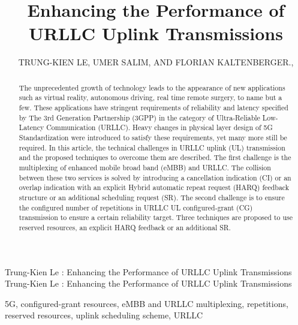 \documentclass{ieeeaccess}
\begin{document}

\title{Enhancing the Performance of URLLC Uplink Transmissions}
\author{\uppercase{Trung-Kien Le},
\uppercase{Umer Salim, and Florian Kaltenberger}.,
}
\address[1]{EURECOM, Sophia Anitpolis, France (e-mail: author@eurecom.fr)}
\address[2]{TCL Mobile, Sophia Antipolis, France (e-mail: author@tcl.com)}


\markboth
{Trung-Kien Le \headeretal: Enhancing the Performance of URLLC Uplink Transmissions}
{Trung-Kien Le \headeretal: Enhancing the Performance of URLLC Uplink Transmissions}


\begin{abstract}
The unprecedented growth of technology leads to the appearance of new applications such as virtual reality, autonomous driving, real time remote surgery, to name but a few. These applications have stringent requirements of reliability and latency specified by The 3rd Generation Partnership (3GPP) in the category of Ultra-Reliable Low-Latency Communication (URLLC). Heavy changes in physical layer design of 5G Standardization were introduced to satisfy these requirements, yet many more still be required. In this article, the technical challenges in URLLC uplink (UL) transmission and the proposed techniques to overcome them are described. The first challenge is the multiplexing of enhanced mobile broad band (eMBB) and URLLC. The collision between these two services is solved by introducing a cancellation indication (CI) or an overlap indication with an explicit Hybrid automatic repeat request (HARQ) feedback structure or an additional scheduling request (SR). The second challenge is to ensure the configured number of repetitions in URLLC UL configured-grant (CG) transmission to ensure a certain reliability target. Three techniques are proposed to use reserved resources, an explicit HARQ feedback or an additional SR.
\end{abstract}

\begin{keywords}
5G, configured-grant resources, eMBB and URLLC multiplexing, repetitions, reserved resources, uplink scheduling scheme, URLLC
\end{keywords}
\end{document}

